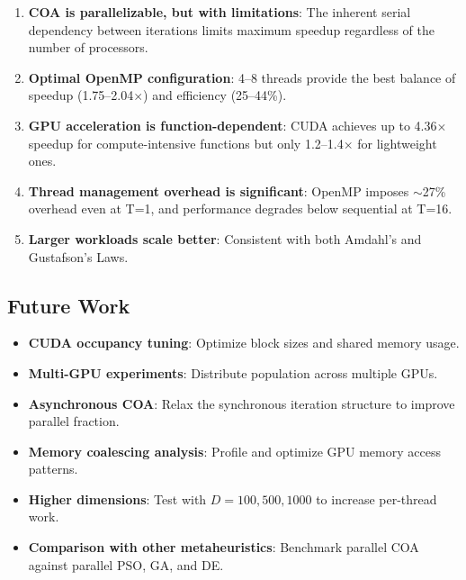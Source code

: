 \documentclass[12pt, a4paper]{article}
\begin{document}
\begin{enumerate}
    \item \textbf{COA is parallelizable, but with limitations}: The inherent serial dependency between iterations limits maximum speedup regardless of the number of processors.
    \item \textbf{Optimal OpenMP configuration}: 4--8 threads provide the best balance of speedup (1.75--2.04$\times$) and efficiency (25--44\%).
    \item \textbf{GPU acceleration is function-dependent}: CUDA achieves up to 4.36$\times$ speedup for compute-intensive functions but only 1.2--1.4$\times$ for lightweight ones.
    \item \textbf{Thread management overhead is significant}: OpenMP imposes $\sim$27\% overhead even at T=1, and performance degrades below sequential at T=16.
    \item \textbf{Larger workloads scale better}: Consistent with both Amdahl's and Gustafson's Laws.
\end{enumerate}

\subsection{Future Work}

\begin{itemize}
    \item \textbf{CUDA occupancy tuning}: Optimize block sizes and shared memory usage.
    \item \textbf{Multi-GPU experiments}: Distribute population across multiple GPUs.
    \item \textbf{Asynchronous COA}: Relax the synchronous iteration structure to improve parallel fraction.
    \item \textbf{Memory coalescing analysis}: Profile and optimize GPU memory access patterns.
    \item \textbf{Higher dimensions}: Test with $D = 100, 500, 1000$ to increase per-thread work.
    \item \textbf{Comparison with other metaheuristics}: Benchmark parallel COA against parallel PSO, GA, and DE.
\end{itemize}
\end{document}
